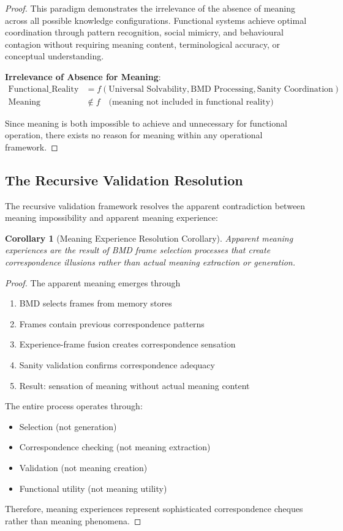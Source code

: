 \documentclass[12pt,a4paper]{article}
\newtheorem{corollary}[theorem]{Corollary}
\begin{document}
\begin{proof}
This paradigm demonstrates the irrelevance of the absence of meaning across all possible knowledge configurations. Functional systems achieve optimal coordination through pattern recognition, social mimicry, and behavioural contagion without requiring meaning content, terminological accuracy, or conceptual understanding.

\textbf{Irrelevance of Absence for Meaning}:
\begin{align}
\text{Functional\_Reality} &= f(\text{Universal Solvability}, \text{BMD Processing}, \text{Sanity Coordination}) \\
\text{Meaning} &\notin f \quad \text{(meaning not included in functional reality)}
\end{align}

Since meaning is both impossible to achieve and unnecessary for functional operation, there exists no reason for meaning within any operational framework.
\end{proof}

\subsection{The Recursive Validation Resolution}

The recursive validation framework resolves the apparent contradiction between meaning impossibility and apparent meaning experience:

\begin{corollary}[Meaning Experience Resolution Corollary]
Apparent meaning experiences are the result of BMD frame selection processes that create correspondence illusions rather than actual meaning extraction or generation.
\end{corollary}

\begin{proof}
The apparent meaning emerges through 
\begin{enumerate}
\item BMD selects frames from memory stores
\item Frames contain previous correspondence patterns
\item Experience-frame fusion creates correspondence sensation
\item Sanity validation confirms correspondence adequacy
\item Result: sensation of meaning without actual meaning content
\end{enumerate}

The entire process operates through:
\begin{itemize}
\item Selection (not generation)
\item Correspondence checking (not meaning extraction)  
\item Validation (not meaning creation)
\item Functional utility (not meaning utility)
\end{itemize}

Therefore, meaning experiences represent sophisticated correspondence cheques rather than meaning phenomena.
\end{proof}
\end{document}
